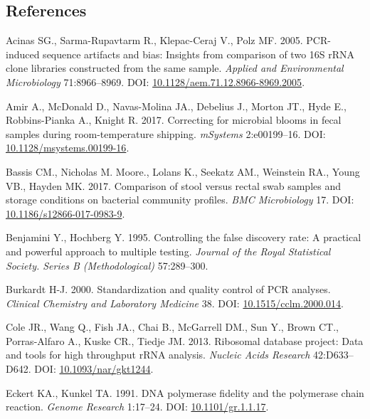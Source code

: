 \documentclass[12pt,]{article}
\begin{document}
\newpage

\subsection{References}\label{references}

\hypertarget{refs}{}
\hypertarget{ref-Acinas2005}{}
Acinas SG., Sarma-Rupavtarm R., Klepac-Ceraj V., Polz MF. 2005.
PCR-induced sequence artifacts and bias: Insights from comparison of two
16S rRNA clone libraries constructed from the same sample. \emph{Applied
and Environmental Microbiology} 71:8966--8969. DOI:
\href{https://doi.org/10.1128/aem.71.12.8966-8969.2005}{10.1128/aem.71.12.8966-8969.2005}.

\hypertarget{ref-Amir2017}{}
Amir A., McDonald D., Navas-Molina JA., Debelius J., Morton JT., Hyde
E., Robbins-Pianka A., Knight R. 2017. Correcting for microbial blooms
in fecal samples during room-temperature shipping. \emph{mSystems}
2:e00199--16. DOI:
\href{https://doi.org/10.1128/msystems.00199-16}{10.1128/msystems.00199-16}.

\hypertarget{ref-storage_Bassis_2017}{}
Bassis CM., Nicholas M. Moore., Lolans K., Seekatz AM., Weinstein RA.,
Young VB., Hayden MK. 2017. Comparison of stool versus rectal swab
samples and storage conditions on bacterial community profiles.
\emph{BMC Microbiology} 17. DOI:
\href{https://doi.org/10.1186/s12866-017-0983-9}{10.1186/s12866-017-0983-9}.

\hypertarget{ref-benjamini_controlling_1995}{}
Benjamini Y., Hochberg Y. 1995. Controlling the false discovery rate: A
practical and powerful approach to multiple testing. \emph{Journal of
the Royal Statistical Society. Series B (Methodological)} 57:289--300.

\hypertarget{ref-Burkardt2000}{}
Burkardt H-J. 2000. Standardization and quality control of PCR analyses.
\emph{Clinical Chemistry and Laboratory Medicine} 38. DOI:
\href{https://doi.org/10.1515/cclm.2000.014}{10.1515/cclm.2000.014}.

\hypertarget{ref-rdp_Cole_2013}{}
Cole JR., Wang Q., Fish JA., Chai B., McGarrell DM., Sun Y., Brown CT.,
Porras-Alfaro A., Kuske CR., Tiedje JM. 2013. Ribosomal database
project: Data and tools for high throughput rRNA analysis. \emph{Nucleic
Acids Research} 42:D633--D642. DOI:
\href{https://doi.org/10.1093/nar/gkt1244}{10.1093/nar/gkt1244}.

\hypertarget{ref-Eckert1991}{}
Eckert KA., Kunkel TA. 1991. DNA polymerase fidelity and the polymerase
chain reaction. \emph{Genome Research} 1:17--24. DOI:
\href{https://doi.org/10.1101/gr.1.1.17}{10.1101/gr.1.1.17}.
\end{document}
